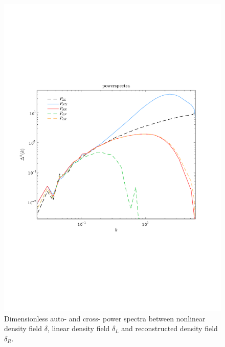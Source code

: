 \documentclass[aps,prd,twocolumn,superscriptaddress,amsfont,amssymb,amsmath,nofootinbib,showpacs,balancelastpage]{revtex4-1}
\begin{document}
\begin{figure}[b] \centering
  \includegraphics[width=1.0\linewidth]{fig1.pdf}
  \caption{Dimensionless auto- and cross- power spectra between nonlinear density field $\delta$, linear density field $\delta_L$ and reconstructed density field $\delta_R$.}
  \label{fig.1}
\end{figure}
\end{document}
